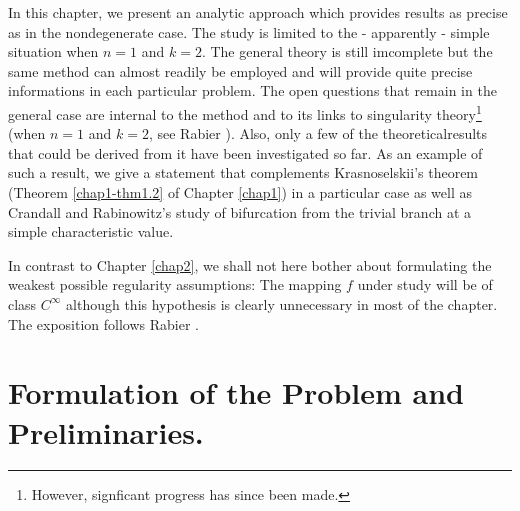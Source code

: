 In this chapter, we present an analytic approach which provides
results as precise as in the nondegenerate case. The study is limited
to the - apparently - simple situation when $n = 1$ and $k = 2$. The
general theory is still imcomplete but the same method can almost
readily be employed and will provide quite precise informations in
each particular problem. The open questions that remain in the general
case are internal to the method and to its links to singularity
theory\footnote{However, signficant progress has since been made.}
(when $n = 1$ and $k = 2$, see Rabier \cite{32}). Also, only a few of the
theoretical\pageoriginale results that could be derived from it have
been investigated so far. As an example of such a result, we give a
statement that complements Krasnoselskii's theorem (Theorem
\ref{chap1-thm1.2} of Chapter {\ref{chap1}}) in a particular case as
well as Crandall and Rabinowitz's study of bifurcation from the
trivial branch at a simple characteristic value.

In contrast to Chapter \ref{chap2}, we shall not here bother about
formulating the weakest possible regularity assumptions: The mapping
$f$ under study will be of class $C^{\infty}$ although this hypothesis
is clearly unnecessary in most of the chapter. The exposition follows
Rabier \cite{32}.

\section{Formulation of the Problem and Preliminaries.}\label{chap5-sec1}

